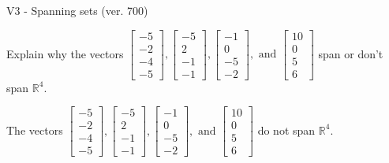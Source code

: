 \begin{exercise}
  \begin{exerciseTitle}V3 - Spanning sets (ver. 700)\end{exerciseTitle}
  \begin{exerciseStatement}
    Explain why the vectors \(\left[\begin{array}{r}
-5 \\
-2 \\
-4 \\
-5
\end{array}\right] , \left[\begin{array}{r}
-5 \\
2 \\
-1 \\
-1
\end{array}\right] , \left[\begin{array}{r}
-1 \\
0 \\
-5 \\
-2
\end{array}\right] , \text{ and } \left[\begin{array}{r}
10 \\
0 \\
5 \\
6
\end{array}\right]\) span or don't span \(\mathbb{R}^4\). 
	


  \end{exerciseStatement}
  \begin{exerciseAnswer}
   The vectors \(\left[\begin{array}{r}
-5 \\
-2 \\
-4 \\
-5
\end{array}\right] , \left[\begin{array}{r}
-5 \\
2 \\
-1 \\
-1
\end{array}\right] , \left[\begin{array}{r}
-1 \\
0 \\
-5 \\
-2
\end{array}\right] , \text{ and } \left[\begin{array}{r}
10 \\
0 \\
5 \\
6
\end{array}\right]\) 
  	 do not  
	span \(\mathbb{R}^4\).
  


  \end{exerciseAnswer}
\end{exercise}